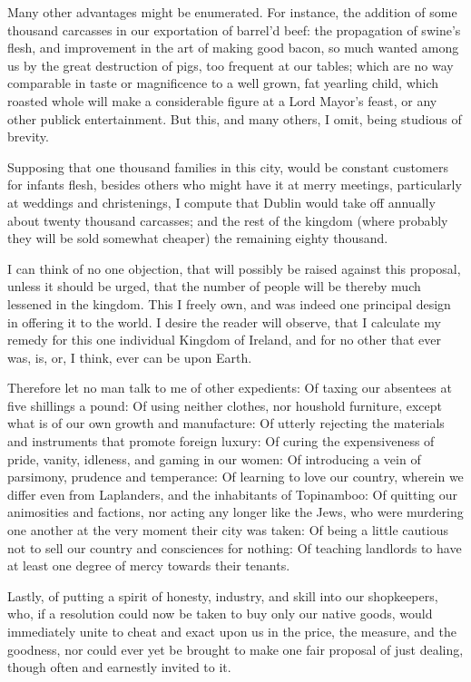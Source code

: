 Many other advantages might be enumerated. For instance, the addition of some thousand carcasses in our exportation of barrel’d beef: the propagation of swine’s flesh, and improvement in the art of making good bacon, so much wanted among us by the great destruction of pigs, too frequent at our tables; which are no way comparable in taste or magnificence to a well grown, fat yearling child, which roasted whole will make a considerable figure at a Lord Mayor’s feast, or any other publick entertainment. But this, and many others, I omit, being studious of brevity.\par

Supposing that one thousand families in this city, would be constant customers for infants flesh, besides others who might have it at merry meetings, particularly at weddings and christenings, I compute that Dublin would take off annually about twenty thousand carcasses; and the rest of the kingdom (where probably they will be sold somewhat cheaper) the remaining eighty thousand.\par

I can think of no one objection, that will possibly be raised against this proposal, unless it should be urged, that the number of people will be thereby much lessened in the kingdom. This I freely own, and was indeed one principal design in offering it to the world. I desire the reader will observe, that I calculate my remedy for this one individual Kingdom of Ireland, and for no other that ever was, is, or, I think, ever can be upon Earth.\par

Therefore let no man talk to me of other expedients: Of taxing our absentees at five shillings a pound: Of using neither clothes, nor houshold furniture, except what is of our own growth and manufacture: Of utterly rejecting the materials and instruments that promote foreign luxury: Of curing the expensiveness of pride, vanity, idleness, and gaming in our women: Of introducing a vein of parsimony, prudence and temperance: Of learning to love our country, wherein we differ even from Laplanders, and the inhabitants of Topinamboo: Of quitting our animosities and factions, nor acting any longer like the Jews, who were murdering one another at the very moment their city was taken: Of being a little cautious not to sell our country and consciences for nothing: Of teaching landlords to have at least one degree of mercy towards their tenants.\par

Lastly, of putting a spirit of honesty, industry, and skill into our shopkeepers, who, if a resolution could now be taken to buy only our native goods, would immediately unite to cheat and exact upon us in the price, the measure, and the goodness, nor could ever yet be brought to make one fair proposal of just dealing, though often and earnestly invited to it.\par

